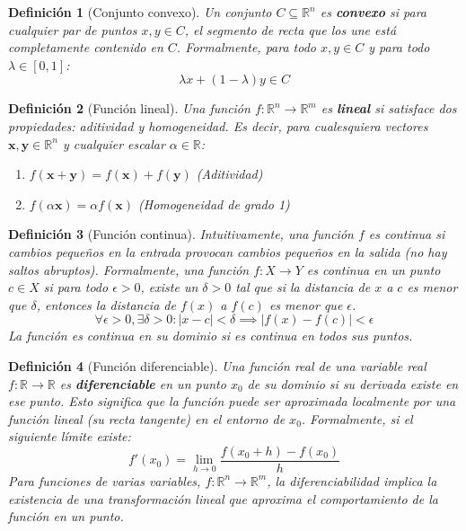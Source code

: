 \documentclass[12pt,a4paper]{book}
\newtheorem{defi}{Definición}[section]
\begin{document}
\begin{defi}[Conjunto convexo]
Un conjunto $C \subseteq \mathbb{R}^n$ es \textbf{convexo} si para cualquier par de puntos $x, y \in C$, el segmento de recta que los une está completamente contenido en $C$. Formalmente, para todo $x, y \in C$ y para todo $\lambda \in [0, 1]$:
$$ \lambda x + (1-\lambda)y \in C $$
\end{defi}

\begin{defi}[Función lineal]
Una función $f: \mathbb{R}^n \to \mathbb{R}^m$ es \textbf{lineal} si satisface dos propiedades: aditividad y homogeneidad. Es decir, para cualesquiera vectores $\mathbf{x}, \mathbf{y} \in \mathbb{R}^n$ y cualquier escalar $\alpha \in \mathbb{R}$:
\begin{enumerate}
    \item $f(\mathbf{x}+\mathbf{y}) = f(\mathbf{x}) + f(\mathbf{y})$ (Aditividad)
    \item $f(\alpha \mathbf{x}) = \alpha f(\mathbf{x})$ (Homogeneidad de grado 1)
\end{enumerate}
\end{defi}

\begin{defi}[Función continua]
Intuitivamente, una función $f$ es continua si cambios pequeños en la entrada provocan cambios pequeños en la salida (no hay saltos abruptos). Formalmente, una función $f: X \to Y$ es continua en un punto $c \in X$ si para todo $\epsilon > 0$, existe un $\delta > 0$ tal que si la distancia de $x$ a $c$ es menor que $\delta$, entonces la distancia de $f(x)$ a $f(c)$ es menor que $\epsilon$.
$$ \forall \epsilon > 0, \exists \delta > 0 : |x-c| < \delta \implies |f(x)-f(c)| < \epsilon $$
La función es continua en su dominio si es continua en todos sus puntos.
\end{defi}

\begin{defi}[Función diferenciable]
Una función real de una variable real $f: \mathbb{R} \to \mathbb{R}$ es \textbf{diferenciable} en un punto $x_0$ de su dominio si su derivada existe en ese punto. Esto significa que la función puede ser aproximada localmente por una función lineal (su recta tangente) en el entorno de $x_0$. Formalmente, si el siguiente límite existe:
$$ f'(x_0) = \lim_{h \to 0} \frac{f(x_0+h) - f(x_0)}{h} $$
Para funciones de varias variables, $f: \mathbb{R}^n \to \mathbb{R}^m$, la diferenciabilidad implica la existencia de una transformación lineal  que aproxima el comportamiento de la función en un punto.
\end{defi}
\end{document}
